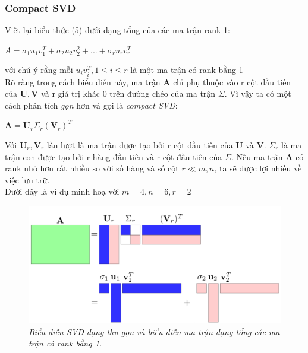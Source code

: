 \subsubsection{Compact SVD}
Viết lại biểu thức (5) dưới dạng tổng của các ma trận rank 1: \\
\begin{center}
	$A=\sigma_1u_1v_1^T+\sigma_2u_2v_2^2+...+\sigma_ru_rv_r^T$
\end{center}
với chú ý rằng mỗi $u_iv_i^T, 1 \leq i \leq r $ là một ma trận có rank bằng 1\\
Rõ ràng trong cách biểu diễn này, ma trận $\mathbf{A}$ chỉ phụ thuộc vào r cột đầu tiên của $\mathbf{U, V}$ và r giá trị khác 0 trên đường chéo của ma trận $\Sigma$. Vì vậy ta có một cách phân tích \textit{gọn} hơn và gọi là \textit{compact SVD}:\\
\begin{center}
	$
	\mathbf{A} = {\mathbf{U}}_r{\Sigma}_r({\mathbf{V}}_r)^T$
\end{center} 
Với $\mathbf{U}_r, \mathbf{V}_r $ lần lượt là ma trận được tạo bởi r cột đầu tiên của $\mathbf{U}$ và $\mathbf{V}$. $\Sigma_r$ là ma trận con được tạo bởi r hàng đầu tiên và r cột đầu tiên của $\Sigma$. Nếu ma trận $\mathbf{A}$ có rank nhỏ hơn rất nhiều so với số hàng và số cột $r \ll m, n$, ta sẽ được lợi nhiều về việc lưu trữ.\\
Dưới đây là ví dụ minh hoạ với $m = 4, n = 6, r = 2$\\

\begin{figure}[!ht]
	\centering
	\includegraphics[scale=0.3]{svd_}
	\caption{\textit{Biểu diễn SVD dạng thu gọn và biểu diễn ma trận dạng tổng các ma trận có rank bằng 1.}}\label{fig:Picture}
\end{figure}\\

